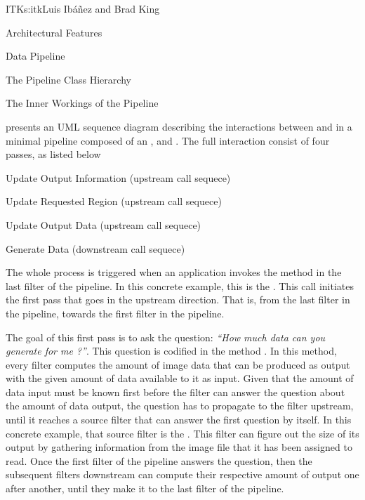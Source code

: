 \begin{aosachapter}{ITK}{s:itk}{Luis Ib\'{a}\~{n}ez and Brad King}
\begin{aosasect1}{Architectural Features}
\begin{aosasect2}{Data Pipeline}
\begin{aosasect3}{The Pipeline Class Hierarchy}
\end{aosasect3}


\begin{aosasect3}{The Inner Workings of the Pipeline}


 presents an UML
sequence diagram describing the interactions between  and
 in a minimal pipeline composed of an ,
 and . The full interaction
consist of four passes, as listed below

\begin{aosaitemize}
\item Update Output Information (upstream call sequece)
\item Update Requested Region (upstream call sequece)
\item Update Output Data (upstream call sequece)
\item Generate Data (downstream call sequece)
\end{aosaitemize}

The whole process is triggered when an application invokes the 
method in the last filter of the pipeline. In this concrete example, this is
the . This  call initiates the first pass
that goes in the upstream direction. That is, from the last filter in the
pipeline, towards the first filter in the pipeline.

The goal of this first pass is to ask the question: \emph{``How much data can
you generate for me ?''}. This question is codified in the method
. In this method, every filter computes the
amount of image data that can be produced as output with the given amount of
data available to it as input. Given that the amount of data input must be
known first before the filter can answer the question about the amount of data
output, the question has to propagate to the filter upstream, until it reaches
a source filter that can answer the first question by itself. In this concrete
example, that source filter is the . This filter can
figure out the size of its output by gathering information from the image file
that it has been assigned to read. Once the first filter of the pipeline
answers the question, then the subsequent filters downstream can compute their
respective amount of output one after another, until they make it to the last
filter of the pipeline.


\end{aosasect3}
\end{aosasect2}
\end{aosasect1}
\end{aosachapter}

